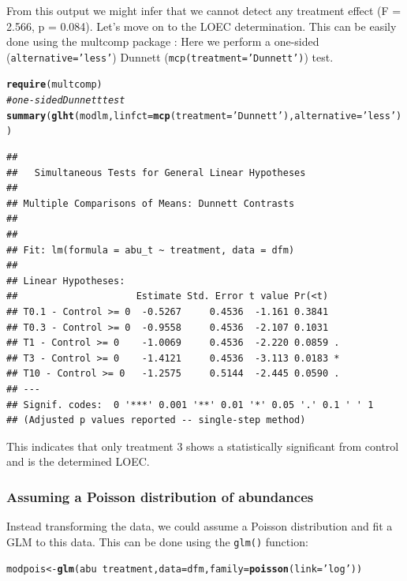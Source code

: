 \documentclass{scrartcl}\usepackage[]{graphicx}\usepackage[]{color}
\makeatletter
\newcommand{\hlstr}[1]{\textcolor[rgb]{0.192,0.494,0.8}{#1}}%
\newcommand{\hlcom}[1]{\textcolor[rgb]{0.678,0.584,0.686}{\textit{#1}}}%
\newcommand{\hlopt}[1]{\textcolor[rgb]{0,0,0}{#1}}%
\newcommand{\hlstd}[1]{\textcolor[rgb]{0.345,0.345,0.345}{#1}}%
\newcommand{\hlkwb}[1]{\textcolor[rgb]{0.69,0.353,0.396}{#1}}%
\newcommand{\hlkwc}[1]{\textcolor[rgb]{0.333,0.667,0.333}{#1}}%
\newcommand{\hlkwd}[1]{\textcolor[rgb]{0.737,0.353,0.396}{\textbf{#1}}}%
\newenvironment{kframe}{%
 \def\at@end@of@kframe{}%
 \ifinner\ifhmode%
  \def\at@end@of@kframe{\end{minipage}}%
  \begin{minipage}{\columnwidth}%
 \fi\fi%
 \def\FrameCommand##1{\hskip\@totalleftmargin \hskip-\fboxsep
 \colorbox{shadecolor}{##1}\hskip-\fboxsep
     \hskip-\linewidth \hskip-\@totalleftmargin \hskip\columnwidth}%
 \MakeFramed {\advance\hsize-\width
   \@totalleftmargin\z@ \linewidth\hsize
   \@setminipage}}%
 {\par\unskip\endMakeFramed%
 \at@end@of@kframe}
\newenvironment{knitrout}{}{} %
\makeatother
\begin{document}
From this output we might infer that we cannot detect any treatment effect (F = 2.566, p = 0.084).
Let's move on to the LOEC determination. This can be easily done using the multcomp package \citep{hothorn_simultaneous_2008}:
Here we perform a one-sided (\texttt{alternative='less'}) Dunnett (\texttt{mcp(treatment='Dunnett')}) test.
\begin{knitrout}
\color{fgcolor}\begin{kframe}
\begin{alltt}
\hlkwd{require}\hlstd{(multcomp)}
\hlcom{# one-sided Dunnett test}
\hlkwd{summary}\hlstd{(}\hlkwd{glht}\hlstd{(modlm,} \hlkwc{linfct} \hlstd{=} \hlkwd{mcp}\hlstd{(}\hlkwc{treatment} \hlstd{=} \hlstr{'Dunnett'}\hlstd{),}  \hlkwc{alternative} \hlstd{=} \hlstr{'less'}\hlstd{))}
\end{alltt}
\begin{verbatim}
## 
## 	 Simultaneous Tests for General Linear Hypotheses
## 
## Multiple Comparisons of Means: Dunnett Contrasts
## 
## 
## Fit: lm(formula = abu_t ~ treatment, data = dfm)
## 
## Linear Hypotheses:
##                     Estimate Std. Error t value Pr(<t)  
## T0.1 - Control >= 0  -0.5267     0.4536  -1.161 0.3841  
## T0.3 - Control >= 0  -0.9558     0.4536  -2.107 0.1031  
## T1 - Control >= 0    -1.0069     0.4536  -2.220 0.0859 .
## T3 - Control >= 0    -1.4121     0.4536  -3.113 0.0183 *
## T10 - Control >= 0   -1.2575     0.5144  -2.445 0.0590 .
## ---
## Signif. codes:  0 '***' 0.001 '**' 0.01 '*' 0.05 '.' 0.1 ' ' 1
## (Adjusted p values reported -- single-step method)
\end{verbatim}
\end{kframe}
\end{knitrout}

This indicates that only treatment 3 shows a statistically significant from control and is the determined LOEC.




\subsubsection{Assuming a Poisson distribution of abundances}

Instead transforming the data, we could assume a Poisson distribution and fit a GLM to this data.
This can be done using the \texttt{glm()} function:
\begin{knitrout}
\color{fgcolor}\begin{kframe}
\begin{alltt}
\hlstd{modpois} \hlkwb{<-} \hlkwd{glm}\hlstd{(abu} \hlopt{~} \hlstd{treatment,} \hlkwc{data} \hlstd{= dfm,} \hlkwc{family} \hlstd{=} \hlkwd{poisson}\hlstd{(}\hlkwc{link} \hlstd{=} \hlstr{'log'}\hlstd{))}
\end{alltt}
\end{kframe}
\end{knitrout}
\end{document}
